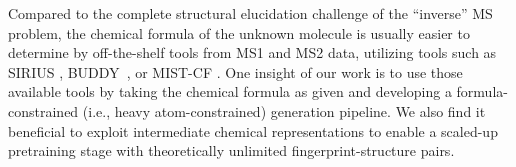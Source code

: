 \documentclass{article}
\theoremstyle{plain}
\theoremstyle{definition}
\theoremstyle{remark}
\begin{document}
Compared to the complete structural elucidation challenge of the ``inverse'' MS problem, 
the chemical formula of the unknown molecule is usually easier to determine by off-the-shelf tools from MS1 and MS2 data, utilizing tools such as SIRIUS \cite{bocker2016fragmentation}, BUDDY~\cite{Xing2023-buddy}, or MIST-CF \cite{goldman2023mist-cf}. 
One insight of our work is to use those available tools by taking the chemical formula as given and developing a formula-constrained (i.e., heavy atom-constrained) generation pipeline. %
We also find it beneficial to exploit intermediate chemical representations to enable a scaled-up pretraining stage with theoretically unlimited fingerprint-structure pairs. 


\end{document}
